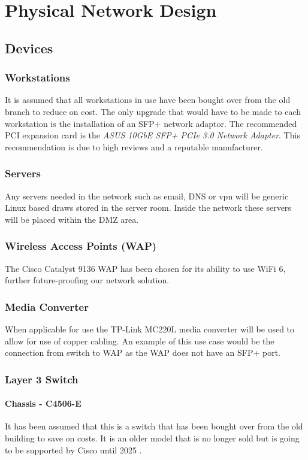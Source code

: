 \chapter{Physical Network Design}

\section{Devices}
\subsection{Workstations}
It is assumed that all workstations in use have been bought over from the old branch to reduce on cost. The only upgrade that would have to be made to each workstation is the installation of an SFP+ network adaptor. The recommended PCI expansion card is the \emph{ASUS 10GbE SFP+ PCIe 3.0 Network Adapter}. This recommendation is due to high reviews and a reputable manufacturer.
\subsection{Servers}
Any servers needed in the network such as email, DNS or vpn will be generic Linux based draws stored in the server room. Inside the network these servers will be placed within the DMZ area.
\subsection{Wireless Access Points (WAP)}
The Cisco Catalyst 9136 WAP has been chosen for its ability to use WiFi 6, further future-proofing our network solution.
\subsection{Media Converter}
When applicable for use the TP-Link MC220L media converter will be used to allow for use of copper cabling. An example of this use case would be the connection from switch to WAP as the WAP does not have an SFP+ port.
\subsection{Layer 3 Switch}
\subsubsection{Chassis - C4506-E}
It has been assumed that this is a switch that has been bought over from the old building to save on costs. It is an older model that is no longer sold but is going to be supported by Cisco until 2025 \parencite{cisco-4506}.
